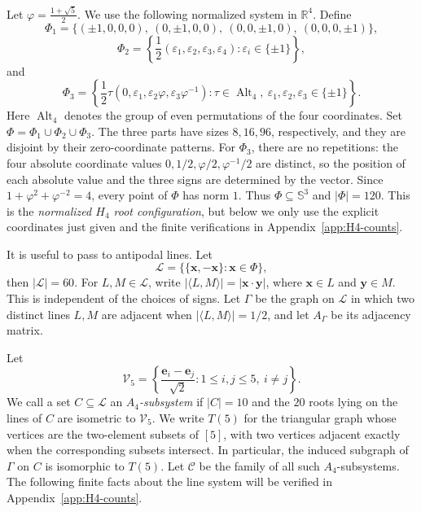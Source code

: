 \documentclass[11pt]{article}
\theoremstyle{definition}
\begin{document}
Let \(\varphi=\frac{1+\sqrt{5}}{2}\).  We use the following normalized system in \(\mathbb R^{4}\). Define
\[
    \Phi_{1}
    =
    \{(\pm1,0,0,0),\ (0,\pm1,0,0),\ (0,0,\pm1,0),\ (0,0,0,\pm1)\},
\]
\[
    \Phi_{2}
    =
    \left\{\frac{1}{2}(\varepsilon_{1},\varepsilon_{2},\varepsilon_{3},\varepsilon_{4}):
    \varepsilon_{i}\in\{\pm1\}\right\},
\]
and
\[
    \Phi_{3}
    =
    \left\{
        \frac{1}{2}\tau(0,\varepsilon_{1},\varepsilon_{2}\varphi,
        \varepsilon_{3}\varphi^{-1}):
        \tau\in\operatorname{Alt}_{4},\ 
        \varepsilon_{1},\varepsilon_{2},\varepsilon_{3}\in\{\pm1\}
    \right\}.
\]
Here \(\operatorname{Alt}_{4}\) denotes the group of even permutations of the
four coordinates.  Set \(\Phi=\Phi_{1}\cup\Phi_{2}\cup\Phi_{3}\).  The three
parts have sizes \(8,16,96\), respectively, and they are disjoint by their
zero-coordinate patterns.  For \(\Phi_{3}\), there are no repetitions:
the four absolute coordinate values
\(0,1/2,\varphi/2,\varphi^{-1}/2\) are distinct, so the position of each
absolute value and the three signs are determined by the vector.  Since
\(1+\varphi^{2}+\varphi^{-2}=4\), every point of \(\Phi\) has norm \(1\).
Thus \(\Phi\subseteq\mathbb S^{3}\) and \(|\Phi|=120\).  This is the
\emph{normalized \(H_{4}\) root configuration}, but below we only use the explicit
coordinates just given and the finite verifications in
Appendix~\ref{app:H4-counts}.

It is useful to pass to antipodal lines.  Let
\[
    \mathcal L=\{\{\boldsymbol{x},-\boldsymbol{x}\}:\boldsymbol{x}\in\Phi\},
\]
then \(|\mathcal L|=60\).  For \(L,M\in\mathcal L\), write
\(|\langle L,M\rangle|=|\boldsymbol{x}\cdot\boldsymbol{y}|\), where
\(\boldsymbol{x}\in L\) and \(\boldsymbol{y}\in M\).  This is independent
of the choices of signs.  Let \(\Gamma\) be the graph on \(\mathcal L\)
in which two distinct lines \(L,M\) are adjacent when
\(|\langle L,M\rangle|=1/2\), and let \(A_{\Gamma}\) be its adjacency matrix.

Let
\[
    \mathcal V_{5}
    =
    \left\{
        \frac{\boldsymbol{e}_{i}-\boldsymbol{e}_{j}}{\sqrt{2}}:
        1\le i,j\le5,\ i\ne j
    \right\}.
\]
We call a set \(C\subseteq\mathcal L\) an \emph{\(A_{4}\)-subsystem} if
\(|C|=10\) and the \(20\) roots lying on the lines of \(C\) are isometric
to \(\mathcal V_{5}\).  We write \(T(5)\) for the triangular graph whose
vertices are the two-element subsets of \([5]\), with two vertices
adjacent exactly when the corresponding subsets intersect. In particular, the induced subgraph of $\Gamma$  on \(C\) is isomorphic to \(T(5)\).
Let \(\mathcal C\) be the family of all such \(A_{4}\)-subsystems.  The
following finite facts about the line system will be verified in
Appendix~\ref{app:H4-counts}.
\end{document}
